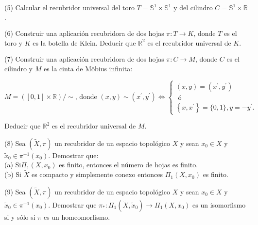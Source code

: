 \documentclass[
  a4paper,
  spanish,
  12pt,
]{scrartcl}
\begin{document}
\begin{ejer}
(5) Calcular el recubridor universal del toro $T=\mathbb{S}^{1} \times \mathbb{S}^{1}$ y del cilindro $C=\mathbb{S}^{1} \times \mathbb{R}$.\\
\end{ejer}

\begin{ejer}
(6) Construir una aplicación recubridora de dos hojas $\pi: T \rightarrow K$, donde $T$ es el toro y $K$ es la botella de Klein. Deducir que $\mathbb{R}^{2}$ es el recubridor universal de $K$.\\
\end{ejer}

\begin{ejer}
(7) Construir una aplicación recubridora de dos hojas $\pi: C \rightarrow M$, donde $C$ es el cilindro y $M$ es la cinta de Möbius infinita:

$$
M=([0,1] \times \mathbb{R}) / \sim \text {, donde }(x, y) \sim\left(x^{\prime}, y^{\prime}\right) \Leftrightarrow\left\{\begin{array}{l}
(x, y)=\left(x^{\prime}, y^{\prime}\right) \\
\text { ó } \\
\left\{x, x^{\prime}\right\}=\{0,1\}, y=-y^{\prime} .
\end{array}\right.
$$


Deducir que $\mathbb{R}^{2}$ es el recubridor universal de $M$.\\
\end{ejer}

\begin{ejer}
(8) Sea $(\widetilde{X}, \pi)$ un recubridor de un espacio topológico $X$ y sean $x_{0} \in X$ y $\widetilde{x}_{0} \in \pi^{-1}\left(x_{0}\right)$. Demostrar que:\\
(a) $\mathrm{Si} \Pi_{1}\left(X, x_{0}\right)$ es finito, entonces el número de hojas es finito.\\
(b) Si $\widetilde{X}$ es compacto y simplemente conexo entonces $\Pi_{1}\left(X, x_{0}\right)$ es finito.\\
\end{ejer}

\begin{ejer}
(9) Sea $(\widetilde{X}, \pi)$ un recubridor de un espacio topológico $X$ y sean $x_{0} \in X$ y $\widetilde{x}_{0} \in \pi^{-1}\left(x_{0}\right)$. Demostrar que $\pi_{*}: \Pi_{1}\left(\widetilde{X}, \widetilde{x}_{0}\right) \rightarrow \Pi_{1}\left(X, x_{0}\right)$ es un isomorfismo si y sólo si $\pi$ es un homeomorfismo.\\
\end{ejer}
\end{document}
